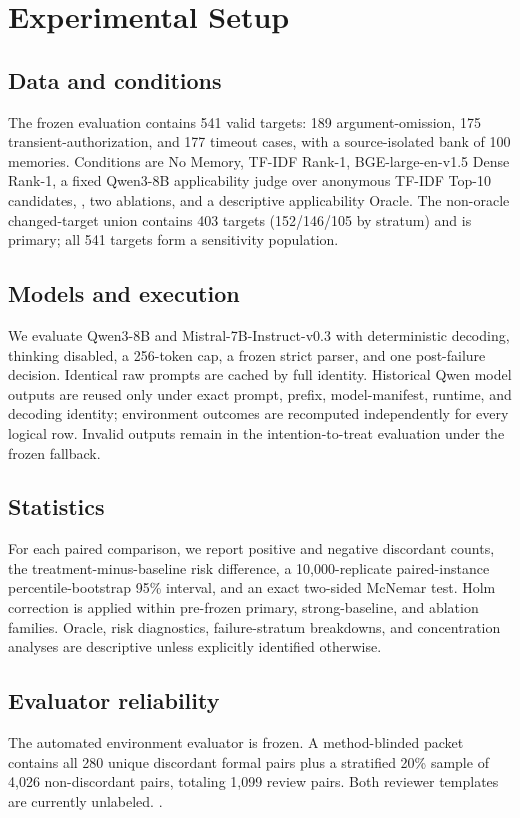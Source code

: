 \section{Experimental Setup}

\subsection{Data and conditions}

The frozen evaluation contains 541 valid targets: 189 argument-omission, 175 transient-authorization, and 177 timeout cases, with a source-isolated bank of 100 memories. Conditions are No Memory, TF-IDF Rank-1, BGE-large-en-v1.5 Dense Rank-1, a fixed Qwen3-8B applicability judge over anonymous TF-IDF Top-10 candidates, \proper, two ablations, and a descriptive applicability Oracle. The non-oracle changed-target union contains 403 targets (152/146/105 by stratum) and is primary; all 541 targets form a sensitivity population.

\subsection{Models and execution}

We evaluate Qwen3-8B and Mistral-7B-Instruct-v0.3 with deterministic decoding, thinking disabled, a 256-token cap, a frozen strict parser, and one post-failure decision. Identical raw prompts are cached by full identity. Historical Qwen model outputs are reused only under exact prompt, prefix, model-manifest, runtime, and decoding identity; environment outcomes are recomputed independently for every logical row. Invalid outputs remain in the intention-to-treat evaluation under the frozen fallback.

\subsection{Statistics}

For each paired comparison, we report positive and negative discordant counts, the treatment-minus-baseline risk difference, a 10,000-replicate paired-instance percentile-bootstrap 95\% interval, and an exact two-sided McNemar test. Holm correction is applied within pre-frozen primary, strong-baseline, and ablation families. Oracle, risk diagnostics, failure-stratum breakdowns, and concentration analyses are descriptive unless explicitly identified otherwise.

\subsection{Evaluator reliability}

The automated environment evaluator is frozen. A method-blinded packet contains all 280 unique discordant formal pairs plus a stratified 20\% sample of 4,026 non-discordant pairs, totaling 1,099 review pairs. Both reviewer templates are currently unlabeled. \todoVOne.

